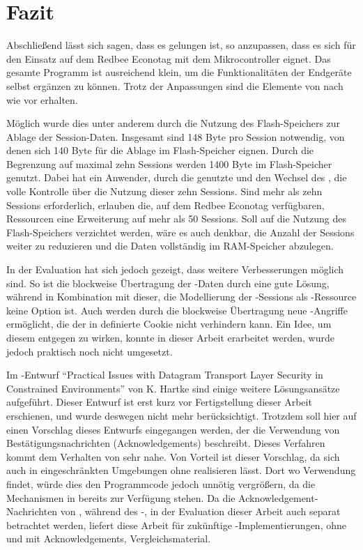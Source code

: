 \chapter{Fazit}
\label{chp:fazit}

Abschließend lässt sich sagen, dass es gelungen ist,  so anzupassen, dass es sich für den Einsatz auf dem
Redbee Econotag mit dem  Mikrocontroller eignet. Das gesamte Programm ist ausreichend klein, um die
Funktionalitäten der Endgeräte selbst ergänzen zu können. Trotz der Anpassungen sind die Elemente von 
nach wie vor erhalten.

Möglich wurde dies unter anderem durch die Nutzung des Flash-Speichers zur Ablage der Session-Daten. Insgesamt
sind 148 Byte pro Session notwendig, von denen sich 140 Byte für die Ablage im Flash-Speicher eignen. Durch die
Begrenzung auf maximal zehn Sessions werden 1400 Byte im Flash-Speicher genutzt. Dabei hat ein Anwender, durch
die genutzte  und den Wechsel des , die volle Kontrolle über die Nutzung dieser zehn
Sessions. Sind mehr als zehn Sessions erforderlich, erlauben die, auf dem Redbee Econotag verfügbaren, Ressourcen
eine Erweiterung auf mehr als 50 Sessions. Soll auf die Nutzung des Flash-Speichers verzichtet werden, wäre es
auch denkbar, die Anzahl der Sessions weiter zu reduzieren und die Daten vollständig im RAM-Speicher abzulegen.

In der Evaluation hat sich jedoch gezeigt, dass weitere Verbesserungen möglich sind. So ist die blockweise
Übertragung der -Daten durch  eine gute Lösung, während in Kombination mit dieser, die Modellierung
der -Sessions als -Ressource keine Option ist. Auch werden durch die blockweise Übertragung neue
-Angriffe ermöglicht, die der in  definierte Cookie nicht verhindern kann. Ein Idee, um diesem
entgegen zu wirken, konnte in dieser Arbeit erarbeitet werden, wurde jedoch praktisch noch nicht umgesetzt.

Im -Entwurf "`Practical Issues with Datagram Transport Layer Security in Constrained Environments"' \cite{draftpractical}
von K. Hartke sind einige weitere Lösungsansätze aufgeführt. Dieser Entwurf ist erst kurz vor Fertigstellung dieser
Arbeit erschienen, und wurde deswegen nicht mehr berücksichtigt. Trotzdem soll hier auf einen Vorschlag dieses Entwurfs
eingegangen werden, der die Verwendung von Bestätigungsnachrichten (Acknowledgements) beschreibt. Dieses Verfahren
kommt dem Verhalten von  sehr nahe. Von Vorteil ist dieser Vorschlag, da sich  auch in eingeschränkten
Umgebungen ohne  realisieren lässt. Dort wo  Verwendung findet, würde dies den Programmcode jedoch
unnötig vergrößern, da die Mechanismen in  bereits zur Verfügung stehen. Da die Acknowledgement-Nachrichten von
, während des -, in der Evaluation dieser Arbeit auch separat betrachtet werden,
liefert diese Arbeit für zukünftige -Implementierungen, ohne  und mit Acknowledgements, Vergleichsmaterial.

